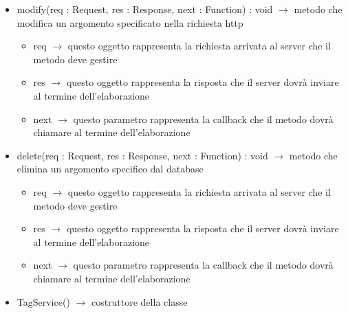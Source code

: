 \begin{description}
\begin{itemize}
	\item modify(req : Request, res : Response, next : Function) : void $\rightarrow$ metodo che modifica un argomento specificato nella richiesta http\begin{itemize}
		\item req $\rightarrow$ questo oggetto rappresenta la richiesta arrivata al server che il metodo deve gestire
		\item res $\rightarrow$ questo oggetto rappresenta la risposta che il server dovrà inviare al termine dell'elaborazione
		\item next $\rightarrow$ questo parametro rappresenta la callback che il metodo dovrà chiamare al termine dell’elaborazione
	\end{itemize}
	
	\item delete(req : Request, res : Response, next : Function) : void $\rightarrow$ metodo che elimina un argomento specifico dal database\begin{itemize}
		\item req $\rightarrow$ questo oggetto rappresenta la richiesta arrivata al server che il metodo deve gestire
		\item res $\rightarrow$ questo oggetto rappresenta la risposta che il server dovrà inviare al termine dell'elaborazione
		\item next $\rightarrow$ questo parametro rappresenta la callback che il metodo dovrà chiamare al termine dell’elaborazione
	\end{itemize}
	
	\item TagService() $\rightarrow$ costruttore della classe
\end{itemize}

\end{description}

\vspace{0.5cm}
\hypertarget{server::service::SessionService}{}
